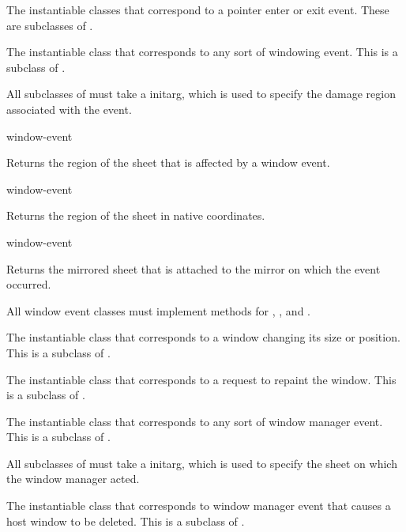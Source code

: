 
The instantiable classes that correspond to a pointer enter or exit event.
These are subclasses of .



The instantiable class that corresponds to any sort of windowing event.  This is
a subclass of .

All subclasses of  must take a  initarg, which is
used to specify the damage region associated with the event.

 {window-event}

Returns the region of the sheet that is affected by a window event.

 {window-event}

Returns the region of the sheet in native coordinates.

 {window-event}

Returns the mirrored sheet that is attached to the mirror on which the event
occurred.

All window event classes must implement methods for ,
, and .


The instantiable class that corresponds to a window changing its size or
position.  This is a subclass of .


The instantiable class that corresponds to a request to repaint the window.
This is a subclass of .



The instantiable class that corresponds to any sort of window manager event.
This is a subclass of .

All subclasses of  must take a  initarg,
which is used to specify the sheet on which the window manager acted.


The instantiable class that corresponds to window manager event that causes a
host window to be deleted.  This is a subclass of .


